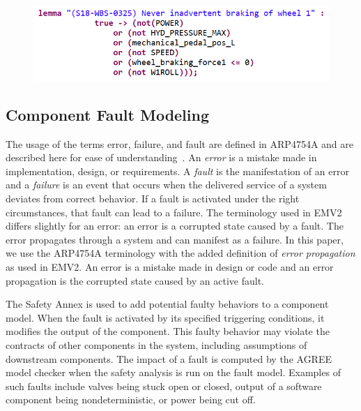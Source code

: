 \begin{figure}[h!]
	\vspace{-0.2in}
	\begin{center}
		\includegraphics[width=.8\textwidth]{images/inadvertent_braking.png}
	\end{center}
	\vspace{-0.3in}
	\label{fig:inadvertent_braking}
	\vspace{-0.2in}
\end{figure}


\subsection{Component Fault Modeling}

The usage of the terms error, failure, and fault are defined in ARP4754A and are described here for ease of understanding~\cite{SAE:ARP4754A}. An \textit{error} is a mistake made in implementation, design, or requirements. A \textit{fault} is the manifestation of an error and a \textit{failure} is an event that occurs when the delivered service of a system deviates from correct behavior. If a fault is activated under the right circumstances, that fault can lead to a failure. The terminology used in EMV2 differs slightly for an error: an error is a corrupted state caused by a fault. The error propagates through a system and can  manifest as a failure. In this paper, we use the ARP4754A terminology with the added definition of \textit{error propagation} as used in EMV2. An error is a mistake made in design or code and an error propagation is the corrupted state caused by an active fault. 

The Safety Annex is used to add potential faulty behaviors to a component model.  When the fault is activated by its specified triggering conditions, it modifies the output of the component. This faulty behavior may violate the contracts of other components in the system, including assumptions of downstream components. The impact of a fault is computed by the AGREE model checker when the safety analysis is run on the fault model. Examples of such faults include valves being stuck open or closed, output of a software component being nondeterministic, or power being cut off. 

